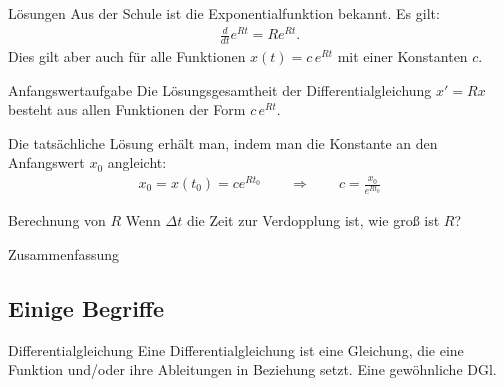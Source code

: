 \documentclass[notheorems,hidelinks,aspectratio=1610]{beamer}
\begin{document}
\begin{frame}{Lösungen}
  Aus der Schule ist die Exponentialfunktion bekannt. Es gilt:
  \begin{gather*}
    \tfrac d{dt} e^{Rt} = R e^{Rt}.
  \end{gather*}
  Dies gilt aber auch für alle Funktionen $x(t) = c \,e^{Rt}$ mit einer Konstanten $c$.

  \begin{block}{Anfangswertaufgabe}
    Die Lösungsgesamtheit der Differentialgleichung $x' = Rx$ besteht
    aus allen Funktionen der Form $c\,e^{Rt}$.

    \vspace{1ex}

    Die tatsächliche Lösung erhält man, indem man die Konstante an den Anfangswert $x_0$ angleicht:
    \begin{gather*}
      x_0 = x(t_0) = c e^{Rt_0} \qquad \Rightarrow \qquad c = \frac{x_0}{e^{R t_0}}
    \end{gather*}
  \end{block}
\end{frame}

\begin{frame}{Berechnung von $R$}
  Wenn $\Delta t$ die Zeit zur Verdopplung ist, wie groß ist $R$?
\end{frame}

\begin{frame}{Zusammenfassung}
  
\end{frame}

\subsection{Einige Begriffe}
\frame{\subtoc}
\begin{frame}
  \begin{block}{Differentialgleichung}
    Eine Differentialgleichung ist eine Gleichung, die eine Funktion
    und/oder ihre Ableitungen in Beziehung setzt. Eine gewöhnliche DGl. 
  \end{block}
\end{frame}
\end{document}
